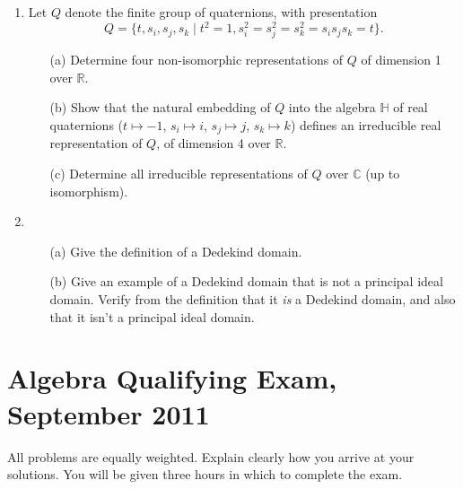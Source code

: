 \documentclass{article}
\begin{document}
\begin{enumerate}
    \item Let \(Q\) denote the finite group of quaternions, with presentation
    \[Q=\{t,s_i,s_j,s_k \mid t^2=1, s_i^2=s_j^2=s_k^2=s_i s_j s_k=t\}.\]
    \begin{itemize}
        \item[(a)] Determine four non-isomorphic representations of \(Q\) of dimension 1 over \(\mathbb{R}\).
        \item[(b)] Show that the natural embedding of \(Q\) into the algebra \(\mathbb{H}\) of real quaternions (\(t\mapsto-1\), \(s_i\mapsto i\), \(s_j\mapsto j\), \(s_k\mapsto k\)) defines an irreducible real representation of \(Q\), of dimension 4 over \(\mathbb{R}\).
        \item[(c)] Determine all irreducible representations of \(Q\) over \(\mathbb{C}\) (up to isomorphism).
    \end{itemize}

    \item 
    \begin{itemize}
        \item[(a)] Give the definition of a Dedekind domain.
        \item[(b)] Give an example of a Dedekind domain that is not a principal ideal domain. Verify from the definition that it \textit{is} a Dedekind domain, and also that it isn't a principal ideal domain.
    \end{itemize}
\end{enumerate}

\section*{Algebra Qualifying Exam, September 2011}

All problems are equally weighted. Explain clearly how you arrive at your solutions. You will be given three hours in which to complete the exam.
\end{document}
